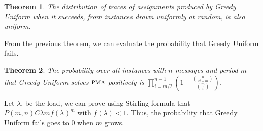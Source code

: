 \documentclass[10pt, conference, letterpaper]{algotel}
\newtheorem{theorem}{Theorem}
\newcommand\pma{\textsc{pma}\xspace}
\begin{document}
\begin{theorem}
The distribution of traces of assignments produced by Greedy Uniform when it succeeds, from instances drawn uniformly at random, is also uniform.
\end{theorem}

From the previous theorem, we can evaluate the probability that Greedy Uniform fails.

\begin{theorem}\label{theorem:uniform}
The probability over all instances with $n$ messages and period $m$ that Greedy Uniform solves $\pma$ positively is $\displaystyle{\prod_{i=m/2}^{n-1}(1 - \frac{\binom{n}{2i-m}}{\binom{m}{i}})}$.
\end{theorem}

Let $\lambda$, be the load, we can prove using Stirling formula that
$P(m,n) C \lambda m f(\lambda)^m$ with $f(\lambda) < 1$. Thus, the probability that Greedy Uniform fails goes to $0$ when $m$ grows. 



 
\end{document}

